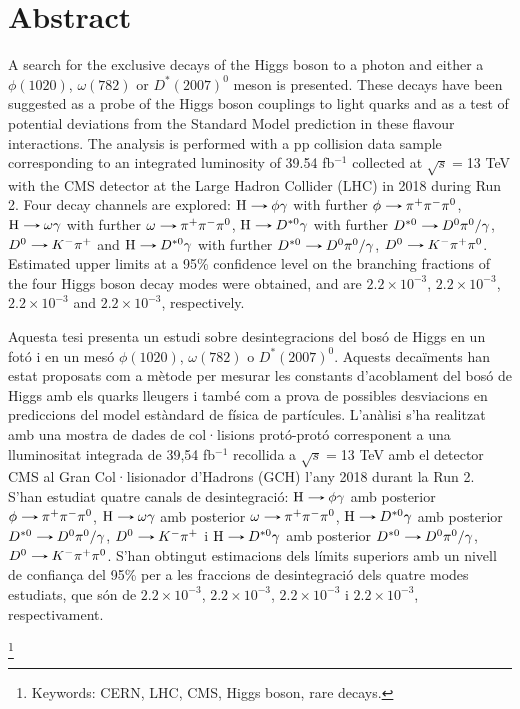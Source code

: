 \thispagestyle{empty}
\makeatletter
\@openrightfalse
\makeatother
\chapter*{Abstract}

\vspace*{-0.2cm}

A search for the exclusive decays of the Higgs boson to a photon and either a $\phi(1020)$, $\omega(782)$ or $D^{*}(2007)^{0}$ meson is presented. These decays have been suggested as a probe of the Higgs boson couplings to light quarks and as a test of potential deviations from the Standard Model prediction in these flavour interactions. The analysis is performed with a pp collision data sample corresponding to an integrated luminosity of 39.54 fb$^{-1}$ collected at $\sqrt{s}=$13 TeV with the CMS detector at the Large Hadron Collider (LHC) in 2018 during Run 2. Four decay channels are explored: $\text{H}\decaysto \phi\gamma$ with further $\phi\decaysto \pi^+\pi^-\pi^0$, $\text{H}\decaysto \omega\gamma$ with further $\omega\decaysto \pi^+\pi^-\pi^0$, $\text{H}\decaysto D^{*0}\gamma$ with further $D^{*0}\decaysto D^{0}\pi^{0}/\gamma$, $D^{0}\decaysto K^{-}\pi^{+}$ and $\text{H}\decaysto D^{*0}\gamma$ with further $D^{*0}\decaysto D^{0}\pi^{0}/\gamma$, $D^{0}\decaysto K^{-}\pi^{+}\pi^{0}$. Estimated upper limits at a 95\% confidence level on the branching fractions of the four Higgs boson decay modes were obtained, and are $2.2\times10^{-3}$, $2.2\times10^{-3}$, $2.2\times10^{-3}$ and $2.2\times10^{-3}$, respectively.

\vspace*{1.5cm}

Aquesta tesi presenta un estudi sobre desintegracions del bosó de Higgs en un fotó i en un mesó $\phi(1020)$, $\omega(782)$ o $D^{*}(2007)^{0}$. Aquests decaïments han estat proposats com a mètode per mesurar les constants d'acoblament del bosó de Higgs amb els quarks lleugers i també com a prova de possibles desviacions en prediccions del model estàndard de física de partícules. L'anàlisi s'ha realitzat amb una mostra de dades de col·lisions protó-protó corresponent a una lluminositat integrada de 39,54 fb$^{-1}$ recollida a $\sqrt{s}=$13 TeV amb el detector CMS al Gran Col·lisionador d'Hadrons (GCH) l'any 2018 durant la Run 2. S'han estudiat quatre canals de desintegració: $\text{H}\decaysto \phi\gamma$ amb posterior $\phi\decaysto \pi^+\pi^-\pi^0$, $\text{H}\decaysto \omega\gamma$ amb posterior $\omega\decaysto \pi^+\pi^-\pi^0$, $\text{H}\decaysto D^{*0}\gamma$ amb posterior $D^{*0}\decaysto D^{0}\pi^{0}/\gamma$, $D^{0}\decaysto K^{-}\pi^{+}$ i $\text{H}\decaysto D^{*0}\gamma$ amb posterior $D^{*0}\decaysto D^{0}\pi^{0}/\gamma$, $D^{0}\decaysto K^{-}\pi^{+}\pi^{0}$. S'han obtingut estimacions dels límits superiors amb un nivell de confiança del 95\% per a les fraccions de desintegració dels quatre modes estudiats, que són de $2.2\times10^{-3}$, $2.2\times10^{-3}$, $2.2\times10^{-3}$ i $2.2\times10^{-3}$, respectivament.

\vspace*{-0.2cm}


{\let\thefootnote\relax\footnote{Keywords: CERN, LHC, CMS, Higgs boson, rare decays.}}
